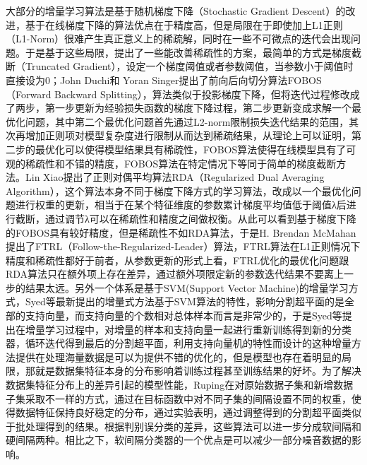 大部分的增量学习算法是基于随机梯度下降（Stochastic Gradient Descent）的改进\cite{hazan2007logarithmic}，基于在线梯度下降的算法优点在于精度高，但是局限在于即使加上L1正则（L1-Norm）很难产生真正意义上的稀疏解，同时在一些不可微点的迭代会出现问题。于是基于这些局限，提出了一些能改善稀疏性的方案，最简单的方式是梯度截断（Truncated Gradient），设定一个梯度阈值或者参数阈值，当参数小于阈值时直接设为0\cite{langford2009sparse}；John Duchi和 Yoran Singer\cite{duchi2009efficient}提出了前向后向切分算法FOBOS（Forward Backward Splitting），算法类似于投影梯度下降，但将迭代过程修改成了两步，第一步更新为经验损失函数的梯度下降过程，第二步更新变成求解一个最优化问题，其中第二个最优化问题首先通过L2-norm限制损失迭代结果的范围，其次再增加正则项对模型复杂度进行限制从而达到稀疏结果，从理论上可以证明，第二步的最优化可以使得模型结果具有稀疏性，FOBOS算法使得在线模型具有了可观的稀疏性和不错的精度，FOBOS算法在特定情况下等同于简单的梯度截断方法。Lin Xiao\cite{xiao2010dual}提出了正则对偶平均算法RDA（Regularized Dual Averaging Algorithm），这个算法本身不同于梯度下降方式的学习算法，改成以一个最优化问题进行权重的更新，相当于在某个特征维度的参数累计梯度平均值低于阈值λ后进行截断，通过调节λ可以在稀疏性和精度之间做权衡。从此可以看到基于梯度下降的FOBOS具有较好精度，但是稀疏性不如RDA算法，于是H. Brendan McMahan提出了FTRL（Follow-the-Regularized-Leader）算法\cite{mcmahan2011follow}，FTRL算法在L1正则情况下精度和稀疏性都好于前者，从参数更新的形式上看，FTRL优化的最优化问题跟RDA算法只在额外项上存在差异，通过额外项限定新的参数迭代结果不要离上一步的结果太远。另外一个体系是基于SVM(Support Vector Machine)的增量学习方式，Syed等\cite{syed1999incremental}最新提出的增量式方法基于SVM算法的特性，影响分割超平面的是全部的支持向量，而支持向量的个数相对总体样本而言是非常少的，于是Syed等提出在增量学习过程中，对增量的样本和支持向量一起进行重新训练得到新的分类器，循环迭代得到最后的分割超平面，利用支持向量机的特性而设计的这种增量方法提供在处理海量数据是可以为提供不错的优化的，但是模型也存在着明显的局限，那就是数据集特征本身的分布影响着训练过程甚至训练结果的好坏。为了解决数据集特征分布上的差异引起的模型性能，Ruping\cite{ruping2001incremental}在对原始数据子集和新增数据子集采取不一样的方式，通过在目标函数中对不同子集的间隔设置不同的权重，使得数据特征保持良好稳定的分布，通过实验表明，通过调整得到的分割超平面类似于批处理得到的结果。根据判别误分类的差异，这些算法可以进一步分成软间隔和硬间隔两种。相比之下，软间隔分类器的一个优点是可以减少一部分噪音数据的影响\cite{kivinen2002large}。

